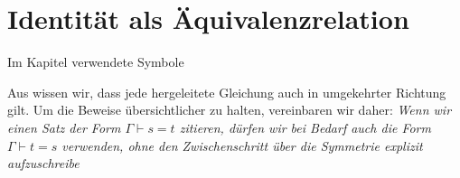 \documentclass[main.tex]{subfiles}
\begin{document}
\section{Identität als Äquivalenzrelation}
\begin{DeltaContext}{Im Kapitel verwendete Symbole}
\end{DeltaContext}

\begin{tabproof}
\end{tabproof}
\begin{remark}
  Aus  wissen wir, dass jede
  hergeleitete Gleichung auch in umgekehrter Richtung gilt.
  Um die Beweise übersichtlicher zu halten, vereinbaren wir daher:
  \emph{Wenn wir einen Satz der Form \(\Gamma \vdash s = t\) zitieren,
  dürfen wir bei Bedarf auch die Form \(\Gamma \vdash t = s\) verwenden,
  ohne den Zwischenschritt über die Symmetrie explizit aufzuschreibe}
\end{remark}

\begin{tabproof}
\end{tabproof}

\begin{tabproof}
\end{tabproof}

\begin{tabproof}
\end{tabproof}

\begin{tabproof}
\end{tabproof}
\end{document}
